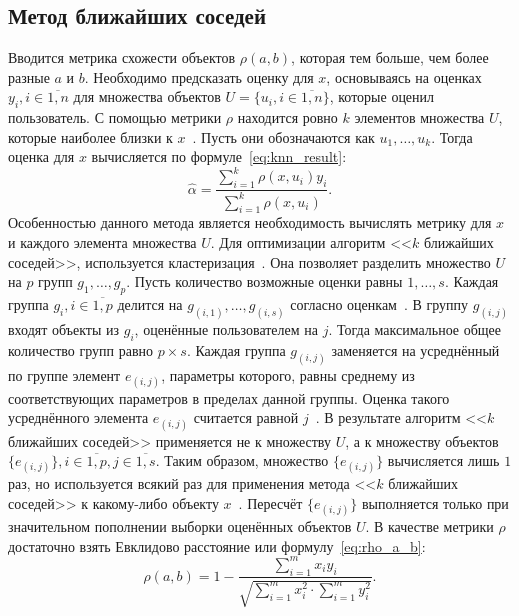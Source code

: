 \subsection{Метод ближайших соседей}
Вводится метрика схожести объектов $\rho(a, b)$, которая тем больше, чем более разные $a$ и $b$.
Необходимо предсказать оценку для $x$, основываясь на оценках $y_i, i \in \overline{1,n}$ для множества объектов $U = \{u_i, i \in \overline{1,n}\}$, которые оценил пользователь.
С помощью метрики $\rho$ находится ровно $k$  элементов множества $U$, которые наиболее близки к $x$~\cite{aggarwal}.
Пусть они обозначаются как $u_1,\dots,u_k$.
Тогда оценка для $x$ вычисляется по формуле~\eqref{eq:knn_result}:
\begin{equation}
\label{eq:knn_result}
    \hat{\alpha} = \frac{\sum\limits_{i=1}^{k} \rho(x,u_i) y_i}{\sum\limits_{i=1}^{k} \rho(x,u_i)}.
\end{equation}
Особенностью данного метода является необходимость вычислять метрику для $x$ и каждого элемента множества $U$.
Для оптимизации алгоритм <<$k$ ближайших соседей>>, используется кластеризация~\cite{aggarwal}.
Она позволяет разделить множество $U$ на $p$ групп $g_1,\dots,g_p$.
Пусть количество возможные оценки равны $1,\dots,s$.
Каждая группа $g_i, i \in \overline{1,p}$ делится на $g_{(i,1)},\dots,g_{(i,s)}$ согласно оценкам~\cite{aggarwal}.
В группу $g_{(i,j)}$ входят объекты из $g_i$, оценённые пользователем на $j$.
Тогда максимальное общее количество групп равно $p \times s$.
Каждая группа $g_{(i,j)}$ заменяется на усреднённый по группе элемент $e_{(i,j)}$, параметры которого, равны среднему из соответствующих параметров в пределах данной группы.
Оценка такого усреднённого элемента $e_{(i,j)}$ считается равной $j$~\cite{aggarwal}.
В результате алгоритм <<$k$ ближайших соседей>> применяется не к множеству $U$, а к множеству объектов $\{e_{(i,j)}\}, i \in \overline{1,p}, j \in \overline{1,s}$.
Таким образом, множество $\{e_{(i,j)}\}$ вычисляется лишь $1$ раз, но используется всякий раз для применения метода <<$k$ ближайших соседей>> к какому-либо объекту $x$~\cite{aggarwal}.
Пересчёт $\{e_{(i,j)}\}$ выполняется только при значительном пополнении выборки оценённых объектов $U$.
В качестве метрики $\rho$ достаточно взять Евклидово расстояние или формулу~\eqref{eq:rho_a_b}:
\begin{equation}
\label{eq:rho_a_b}
    \rho(a,b) = 1 - \frac{\sum\limits_{i=1}^{m} x_i y_i}{\sqrt{\sum\limits_{i=1}^{m} x_i^2 \cdot \sum\limits_{i=1}^{m} y_i^2}}.
\end{equation}

